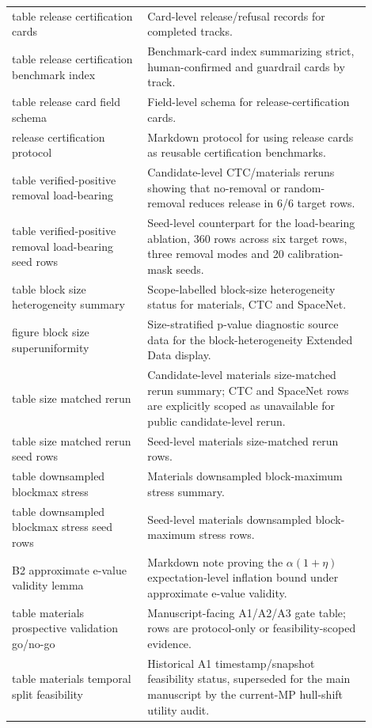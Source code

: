 \documentclass[11pt]{article}
\begin{document}
\begin{longtable}{p{0.34\linewidth}p{0.56\linewidth}}
table release certification cards & Card-level release/refusal records for completed tracks. \\
table release certification benchmark index & Benchmark-card index summarizing strict, human-confirmed and guardrail cards by track. \\
table release card field schema & Field-level schema for release-certification cards. \\
release certification protocol & Markdown protocol for using release cards as reusable certification benchmarks. \\
table verified-positive removal load-bearing & Candidate-level CTC/materials reruns showing that no-removal or random-removal reduces release in 6/6 target rows. \\
table verified-positive removal load-bearing seed rows & Seed-level counterpart for the load-bearing ablation, 360 rows across six target rows, three removal modes and 20 calibration-mask seeds. \\
table block size heterogeneity summary & Scope-labelled block-size heterogeneity status for materials, CTC and SpaceNet. \\
figure block size superuniformity & Size-stratified p-value diagnostic source data for the block-heterogeneity Extended Data display. \\
table size matched rerun & Candidate-level materials size-matched rerun summary; CTC and SpaceNet rows are explicitly scoped as unavailable for public candidate-level rerun. \\
table size matched rerun seed rows & Seed-level materials size-matched rerun rows. \\
table downsampled blockmax stress & Materials downsampled block-maximum stress summary. \\
table downsampled blockmax stress seed rows & Seed-level materials downsampled block-maximum stress rows. \\
B2 approximate e-value validity lemma & Markdown note proving the \(\alpha(1+\eta)\) expectation-level inflation bound under approximate e-value validity. \\
table materials prospective validation go/no-go & Manuscript-facing A1/A2/A3 gate table; rows are protocol-only or feasibility-scoped evidence. \\
table materials temporal split feasibility & Historical A1 timestamp/snapshot feasibility status, superseded for the main manuscript by the current-MP hull-shift utility audit. \\

\end{longtable}
\end{document}
